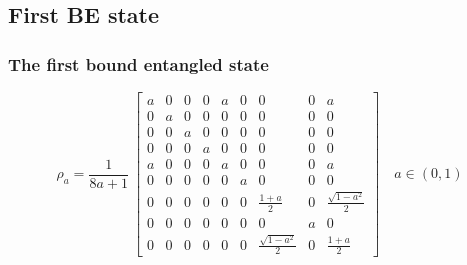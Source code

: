 \documentclass[compress,notes=hide]{beamer}
\begin{document}
\subsection{First BE state}

\begin{frame}
\frametitle{The first bound entangled state}

{
\begin{equation*}
  \rho_a = \frac{1}{8a + 1} \ \begin{bmatrix} 
    a & 0 & 0 & 0 & a & 0 & 0 & 0 & a \\
    0 & a & 0 & 0 & 0 & 0 & 0 & 0 & 0 \\
    0 & 0 & a & 0 & 0 & 0 & 0 & 0 & 0 \\
    0 & 0 & 0 & a & 0 & 0 & 0 & 0 & 0 \\
    a & 0 & 0 & 0 & a & 0 & 0 & 0 & a \\
    0 & 0 & 0 & 0 & 0 & a & 0 & 0 & 0 \\
    0 & 0 & 0 & 0 & 0 & 0 & \frac{1+a}{2} & 0 & \frac{\sqrt{1-a^2}}{2} \\
    0 & 0 & 0 & 0 & 0 & 0 & 0 & a & 0 \\
    0 & 0 & 0 & 0 & 0 & 0 & \frac{\sqrt{1-a^2}}{2} & 0 & \frac{1+a}{2} 
    \end{bmatrix}
  \quad a \in (0,1)
\end{equation*}
}

\end{frame}
\end{document}

